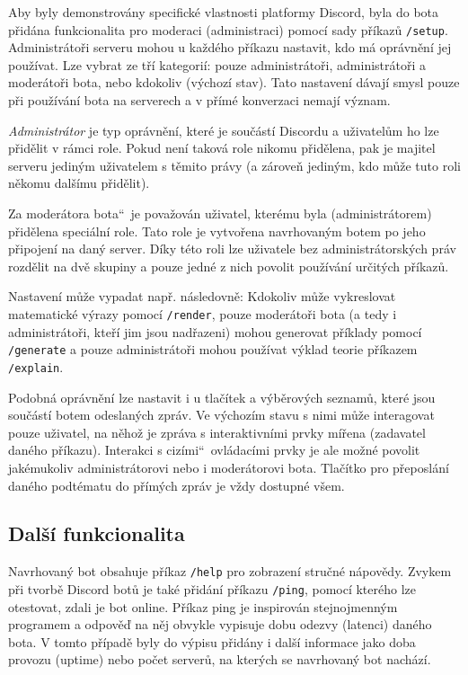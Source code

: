 \documentclass[FM]{tulthesis}
\begin{document}
	Aby byly demonstrovány specifické vlastnosti platformy Discord, byla do bota přidána funkcionalita pro moderaci (administraci) pomocí sady příkazů \verb*|/setup|. Administrátoři serveru mohou u každého příkazu nastavit, kdo má oprávnění jej používat. Lze vybrat ze tří kategorií: pouze administrátoři, administrátoři a moderátoři bota, nebo kdokoliv (výchozí stav). Tato nastavení dávají smysl pouze při používání bota na serverech a v přímé konverzaci nemají význam.
	
	\textit{Administrátor} je typ oprávnění, které je součástí Discordu a uživatelům ho lze přidělit v rámci role. Pokud není taková role nikomu přidělena, pak je majitel serveru jediným uživatelem s těmito právy (a zároveň jediným, kdo může tuto roli někomu dalšímu přidělit).
	
	Za \quotedblbase moderátora bota\textquotedblleft\ je považován uživatel, kterému byla (administrátorem) přidělena speciální role. Tato role je vytvořena navrhovaným botem po jeho připojení na daný server. Díky této roli lze uživatele bez administrátorských práv rozdělit na dvě skupiny a pouze jedné z nich povolit používání určitých příkazů.
	
	Nastavení může vypadat např. následovně: Kdokoliv může vykreslovat matematické výrazy pomocí \verb*|/render|, pouze moderátoři bota (a tedy i administrátoři, kteří jim jsou nadřazeni) mohou generovat příklady pomocí \verb*|/generate| a pouze administrátoři mohou používat výklad teorie příkazem \verb*|/explain|.
	
	Podobná oprávnění lze nastavit i u tlačítek a výběrových seznamů, které jsou součástí botem odeslaných zpráv. Ve výchozím stavu s nimi může interagovat pouze uživatel, na něhož je zpráva s interaktivními prvky mířena (zadavatel daného příkazu). Interakci s \quotedblbase cizími\textquotedblleft\ ovládacími prvky je ale možné povolit jakémukoliv administrátorovi nebo i moderátorovi bota. Tlačítko pro přeposlání daného podtématu do přímých zpráv je vždy dostupné všem.
	
	\subsection{Další funkcionalita} %
	
	Navrhovaný bot obsahuje příkaz \verb*|/help| pro zobrazení stručné nápovědy. Zvykem při tvorbě Discord botů je také přidání příkazu \verb*|/ping|, pomocí kterého lze otestovat, zdali je bot online. Příkaz ping je inspirován stejnojmenným programem a odpověď na něj obvykle vypisuje dobu odezvy (latenci) daného bota. V tomto případě byly do výpisu přidány i další informace jako doba provozu (uptime) nebo počet serverů, na kterých se navrhovaný bot nachází.
	
\end{document}
